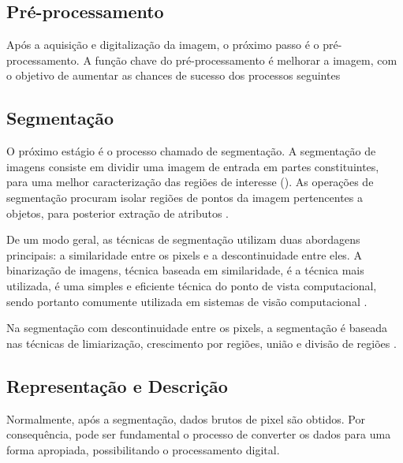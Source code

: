 \subsection{Pré-processamento}
Após a aquisição e digitalização da imagem, o próximo passo é o pré-processamento. A função chave do pré-processamento é melhorar a imagem, com o objetivo de aumentar as chances de sucesso dos processos seguintes \cite{GONZALEZ1992} %

\subsection{Segmentação}

O próximo estágio é o processo chamado de segmentação. A segmentação de imagens consiste em dividir uma imagem de entrada em partes
constituintes, para uma melhor caracterização das regiões de interesse (). As operações de segmentação procuram isolar regiões de pontos da imagem pertencentes a objetos, para
posterior extração de atributos \cite{Lourdes2010}.

De um modo geral, as técnicas de segmentação utilizam duas abordagens
principais: a similaridade entre os pixels e a descontinuidade entre eles. A binarização de imagens, técnica baseada em similaridade, é a técnica mais utilizada, é uma  simples e eficiente técnica do ponto de vista computacional, sendo portanto comumente utilizada em sistemas de visão computacional \cite{ISRAEL2003}.


Na segmentação com descontinuidade entre os pixels, a segmentação é baseada nas técnicas de limiarização, crescimento por regiões, união e divisão de regiões \cite{Rodrigues2002}. %


\subsection{Representação e Descrição}

Normalmente, após a segmentação, dados brutos de pixel são obtidos. Por consequência, pode ser fundamental o processo de converter os dados para uma forma apropiada, possibilitando o processamento digital. 

